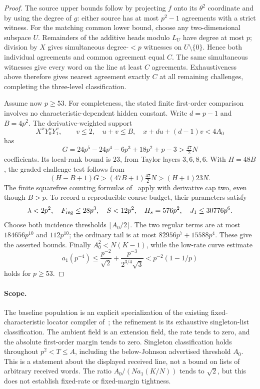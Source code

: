 \begin{proof}
The source upper bounds follow by projecting $f$ onto its
$\theta^2$ coordinate and by using the degree of $g$: either source
has at most $p^2-1$ agreements with a strict witness. For the matching
common lower bound, choose any two-dimensional subspace $U$.
Remainders of the additive heads modulo $L_U$ have degree at most
$p$; division by $X$ gives simultaneous degree-$<p$ witnesses on
$U\setminus\{0\}$. Hence both individual agreements and common
agreement equal $C$. The same simultaneous witnesses give every word
on the line at least $C$ agreements. Exhaustiveness above therefore
gives nearest agreement exactly $C$ at all remaining challenges,
completing the three-level classification.

Assume now $p\ge53$. For completeness, the stated finite first-order comparison involves
no characteristic-dependent hidden constant. Write $d=p-1$ and
$B=4p^2$. The derivative-weighted support
\[
 X^xY_0^uY_1^v,\qquad v\le2,\quad u+v\le B,
 \quad x+du+(d-1)v<4A_0
\]
has
\[
 G=24p^5-24p^4-6p^3+18p^2+p-3>\tfrac{47}{2}N
\]
coefficients. Its local-rank bound is $23$, from Taylor layers
$3,6,8,6$. With $H=48B$, the graded challenge test follows from
\[
 (H-B+1)G>(47B+1)\tfrac{47}{2}N>(H+1)23N.
\]
The finite squarefree counting formulas
of~\cite[Eqs.~(38), (54), and (55)]{dkt2026} apply with derivative cap two,
even though $B>p$. To record a reproducible coarse budget, their
parameters satisfy
\[
 \lambda<2p^2,\quad F_{\rm reg}\le28p^3,\quad
 S<12p^2,\quad H_s=576p^2,\quad J_1\le30776p^6.
\]
Choose both incidence thresholds $\lfloor A_0/2\rfloor$.
The two regular terms are at most $184656p^{10}$ and $112p^{10}$;
the ordinary tail is at most $82956p^7+15588p^4$.
These give the asserted bounds.
Finally $A_0^2<N(K-1)$, while the low-rate curve estimate
\[
 a_1(p^{-4})\le\frac{p^{-2}}{\sqrt2}
     +\frac{p^{-3}}{2^{3/4}\sqrt3}
     <p^{-2}(1-1/p)
\]
holds for $p\ge53$.
\end{proof}

\paragraph{Scope.}
The baseline population is an explicit specialization of the existing
fixed-characteristic locator compiler
of~\cite{binary-counterexamples}; the refinement is its exhaustive
singleton-list classification. The ambient field is an extension field,
the rate tends to zero, and the absolute first-order margin tends to zero.
Singleton classification holds throughout $p^2<T\le A$, including
the below-Johnson advertised threshold $A_0$. This is a statement about
the displayed received line, not a bound on lists of arbitrary received words.
The ratio $A_0/(Na_1(K/N))$ tends to $\sqrt2$, but this does not establish
fixed-rate or fixed-margin tightness.
